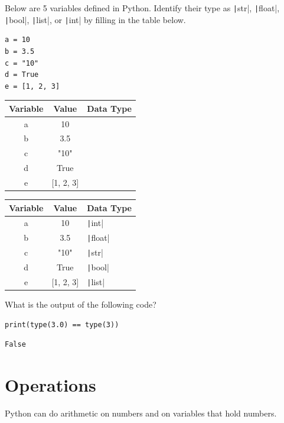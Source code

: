 \begin{Exercise}[label=datatypes1, title=Identify the variable type]
Below are 5 variables defined in Python. Identify their type as \texttt|str|, \texttt|float|, \texttt|bool|, \texttt|list|, or \texttt|int| by filling in the table below. 
\begin{verbatim}
a = 10
b = 3.5
c = "10"
d = True
e = [1, 2, 3]
\end{verbatim}

\begin{tabular}{|c|c|p{4cm}|}
\hline
Variable & Value & Data Type \\
\hline
a & 10 & \\
\hline
b & 3.5 & \\
\hline
c & "10" & \\
\hline
d & True & \\
\hline
e & [1, 2, 3] & \\
\hline
\end{tabular}

\end{Exercise}
\begin{Answer}[ref=datatypes1]
\begin{tabular}{|c|c|p{4cm}|}
\hline
Variable & Value & Data Type \\
\hline
a & 10 & \texttt|int|\\
\hline
b & 3.5 & \texttt|float|\\
\hline
c & "10" & \texttt|str|\\
\hline
d & True & \texttt|bool|\\
\hline
e & [1, 2, 3] & \texttt|list|\\
\hline
\end{tabular}
\end{Answer}

\begin{Exercise}[label=datatypes2, title=What does this do?]
What is the output of the following code?
\begin{verbatim}
print(type(3.0) == type(3))
\end{verbatim}
\end{Exercise}
\begin{Answer}[ref=datatypes2]
\begin{verbatim}
False
\end{verbatim}
\end{Answer}

\section{Operations}
Python can do arithmetic on numbers and on variables that hold numbers.
